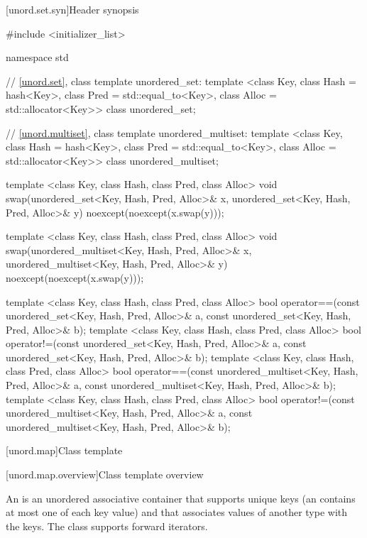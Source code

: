 [unord.set.syn]{Header  synopsis}%
%
%
%
\begin{codeblock}
#include <initializer_list>

namespace std {
  // \ref{unord.set}, class template unordered_set:
  template <class Key,
            class Hash = hash<Key>,
            class Pred = std::equal_to<Key>,
            class Alloc = std::allocator<Key>>
    class unordered_set;

  // \ref{unord.multiset}, class template unordered_multiset:
  template <class Key,
            class Hash = hash<Key>,
            class Pred = std::equal_to<Key>,
            class Alloc = std::allocator<Key>>
    class unordered_multiset;

  template <class Key, class Hash, class Pred, class Alloc>
    void swap(unordered_set<Key, Hash, Pred, Alloc>& x,
              unordered_set<Key, Hash, Pred, Alloc>& y)
      noexcept(noexcept(x.swap(y)));

  template <class Key, class Hash, class Pred, class Alloc>
    void swap(unordered_multiset<Key, Hash, Pred, Alloc>& x,
              unordered_multiset<Key, Hash, Pred, Alloc>& y)
      noexcept(noexcept(x.swap(y)));

  template <class Key, class Hash, class Pred, class Alloc>
    bool operator==(const unordered_set<Key, Hash, Pred, Alloc>& a,
                    const unordered_set<Key, Hash, Pred, Alloc>& b);
  template <class Key, class Hash, class Pred, class Alloc>
    bool operator!=(const unordered_set<Key, Hash, Pred, Alloc>& a,
                    const unordered_set<Key, Hash, Pred, Alloc>& b);
  template <class Key, class Hash, class Pred, class Alloc>
    bool operator==(const unordered_multiset<Key, Hash, Pred, Alloc>& a,
                    const unordered_multiset<Key, Hash, Pred, Alloc>& b);
  template <class Key, class Hash, class Pred, class Alloc>
    bool operator!=(const unordered_multiset<Key, Hash, Pred, Alloc>& a,
                    const unordered_multiset<Key, Hash, Pred, Alloc>& b);
}
\end{codeblock}

[unord.map]{Class template }%

[unord.map.overview]{Class template  overview}

\pnum
{}%
%
An  is an unordered associative container that
supports unique keys (an  contains at most one of each
key value) and that associates values of another type
 with the keys.
The  class
supports forward iterators.

